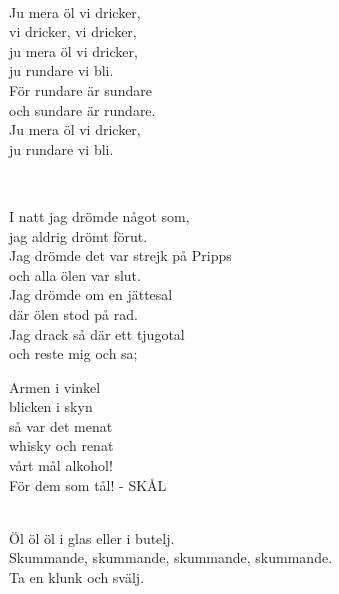 
 \\       

\songtext{}
Ju mera öl vi dricker, \\ 
vi dricker, vi dricker, \\ 
ju mera öl vi dricker, \\ 
ju rundare vi bli. \\ 
För rundare är sundare \\ 
och sundare är rundare. \\ 
Ju mera öl vi dricker, \\ 
ju rundare vi bli. 

\newpage

 \\       

\songtext{}I natt jag drömde något som,  \\
jag aldrig drömt förut.  \\
Jag drömde det var strejk på Pripps  \\
och alla ölen var slut.  \\
Jag drömde om en jättesal  \\
där ölen stod på rad.  \\
Jag drack så där ett tjugotal  \\
och reste mig och sa; 
 
Armen i vinkel  \\
blicken i skyn  \\
så var det menat  \\
whisky och renat  \\
vårt mål alkohol!  \\
För dem som tål! - SKÅL  \\


 \\       

\songtext{}Öl öl öl i glas eller i butelj. \\
Skummande, skummande, skummande, skummande. \\
Ta en klunk och svälj. \\

